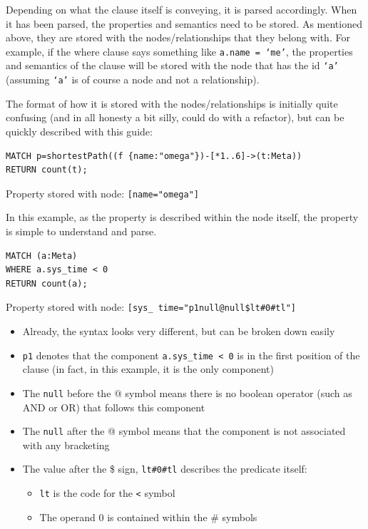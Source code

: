 \documentclass[letterpaper]{ltxdoc}
\begin{document}
Depending on what the clause itself is conveying, it is parsed accordingly. When it has been parsed, the properties and semantics need to be stored. As mentioned above, they are stored with the nodes/relationships that they belong with. For example, if the where clause says something like \texttt{a.name = `me'}, the properties and semantics of the clause will be stored with the node that has the id \texttt{`a'} (assuming \texttt{`a'} is of course a node and not a relationship).

The format of how it is stored with the nodes/relationships is initially quite confusing (and in all honesty a bit silly, could do with a refactor), but can be quickly described with this guide:

\bigskip

\begin{lstlisting}[language=Cypher]
MATCH p=shortestPath((f {name:"omega"})-[*1..6]->(t:Meta))
RETURN count(t);
\end{lstlisting}

Property stored with node: \texttt{[name="omega"]}

In this example, as the property is described within the node itself, the property is simple to understand and parse.

\bigskip

\begin{lstlisting}[language=Cypher]
MATCH (a:Meta)
WHERE a.sys_time < 0
RETURN count(a);
\end{lstlisting}

Property stored with node: \texttt{[sys\_ time="p1null@null\$lt\#0\#tl"]}

\begin{itemize}
\item Already, the syntax looks very different, but can be broken down easily
\item \texttt{p1} denotes that the component \texttt{a.sys\_time < 0} is in the first position of the clause (in fact, in this example, it is the only component)
\item The \texttt{null} before the @ symbol means there is no boolean operator (such as AND or OR) that follows this component
\item The \texttt{null} after the @ symbol means that the component is not associated with any bracketing
\item The value after the \$ sign, \texttt{lt\#0\#tl} describes the predicate itself:
\begin{itemize}
\item \texttt{lt} is the code for the \texttt{<} symbol
\item The operand 0 is contained within the \# symbols
\end{itemize}
\end{itemize}
\end{document}

